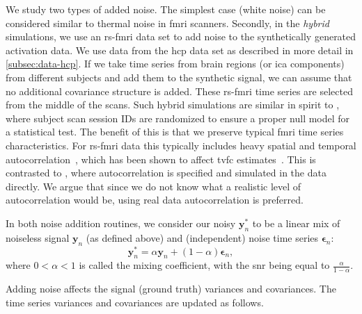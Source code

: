 We study two types of added noise.
The simplest case (white noise) can be considered similar to thermal noise in \gls{fmri} scanners.
Secondly, in the \emph{hybrid} simulations, we use an \gls{rs-fmri} data set to add noise to the synthetically generated activation data.
We use data from the \gls{hcp} data set as described in more detail in \cref{subsec:data-hcp}.
If we take time series from brain regions (or \gls{ica} components) from different subjects and add them to the synthetic signal, we can assume that no additional covariance structure is added.
These \gls{rs-fmri} time series are selected from the middle of the scans.
Such hybrid simulations are similar in spirit to \textcite{Keilholz2013}, where subject scan session IDs are randomized to ensure a proper null model for a statistical test.
The benefit of this is that we preserve typical \gls{fmri} time series characteristics.
For \gls{rs-fmri} data this typically includes heavy spatial and temporal autocorrelation~\parencite{Keilholz2017}, which has been shown to affect \gls{tvfc} estimates~\parencite{Honari2019}.
This is contrasted to \textcite{Thompson2018}, where autocorrelation is specified and simulated in the data directly.
We argue that since we do not know what a realistic level of autocorrelation would be, using real data autocorrelation is preferred.

In both noise addition routines, we consider our noisy $\mathbf{y}_n^*$ to be a linear mix of noiseless signal $\mathbf{y}_n$ (as defined above) and (independent) noise time series $\mathbf{\epsilon}_n$:
\begin{equation}
  \mathbf{y}_n^* = \alpha \mathbf{y}_n + (1 - \alpha) \mathbf{\epsilon}_n,
\end{equation}
where $0 < \alpha < 1$ is called the mixing coefficient, with the \gls{snr} being equal to $\frac{\alpha}{1-\alpha}$.

Adding noise affects the signal (ground truth) variances and covariances.
The time series variances and covariances are updated as follows.

